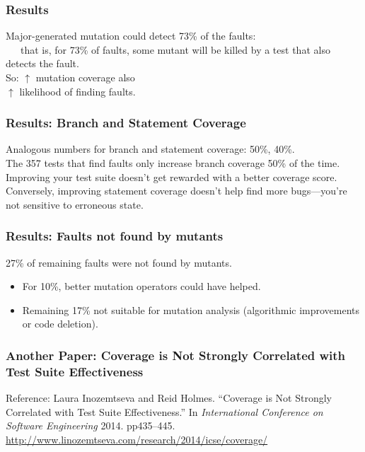\documentclass{beamer}
\newenvironment{changemargin}[1]{%
  \begin{list}{}{%
    \setlength{\topsep}{0pt}%
    \setlength{\leftmargin}{#1}%
    \setlength{\rightmargin}{1em}
    \setlength{\listparindent}{\parindent}%
    \setlength{\itemindent}{\parindent}%
    \setlength{\parsep}{\parskip}%
  }%
  \item[]}{\end{list}}
\begin{document}
\begin{frame}
  \frametitle{Results}
  \Large
  \begin{changemargin}{2em}
    Major-generated mutation could detect 73\% of the faults:\\
    ~~~that is, for 73\% of faults, some mutant will be killed by a test that also detects the fault.\\[1em]
    So: $\uparrow$ mutation coverage  also \\
    \hspace*{3em}$\uparrow$ likelihood of finding faults.\\[2em]
    
  \end{changemargin}
\end{frame}

\begin{frame}
  \frametitle{Results: Branch and Statement Coverage}
  \Large
  \begin{changemargin}{2em}
    Analogous numbers for branch and statement coverage: 50\%, 40\%.\\[1em]
    The 357 tests that find faults only increase branch coverage 50\% of the time.\\[1em]
    Improving your test suite doesn't get rewarded with a better coverage score.\\[1em]
    Conversely, improving statement coverage doesn't help find more bugs---you're not sensitive to erroneous state.
  \end{changemargin}
\end{frame}

\begin{frame}
  \frametitle{Results: Faults not found by mutants}
  \Large
  \begin{changemargin}{2em}
    27\% of remaining faults were not found by mutants.\\[1em]
    \begin{itemize}
    \item For 10\%, better mutation operators could have helped.
    \item Remaining 17\% not suitable for mutation analysis (algorithmic improvements or code deletion).
    \end{itemize}
  \end{changemargin}
\end{frame}
    

\begin{frame}
  \frametitle{Another Paper: Coverage is Not Strongly Correlated with Test Suite Effectiveness}

  \begin{changemargin}{2em}
  \scriptsize
  Reference: Laura Inozemtseva and Reid Holmes.
``Coverage is Not Strongly Correlated with Test Suite Effectiveness.''
In {\em International Conference on Software Engineering} 2014. pp435--445.
\url{http://www.linozemtseva.com/research/2014/icse/coverage/}
  \end{changemargin}

\end{frame}
\end{document}
